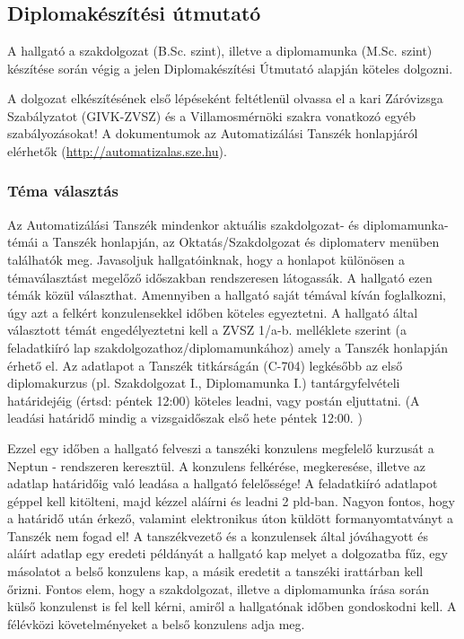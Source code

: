 \chapter{\bevezetes}

\section{Diplomakészítési útmutató}

A hallgató a szakdolgozat (B.Sc. szint), illetve a diplomamunka (M.Sc. szint) készítése során végig a jelen Diplomakészítési Útmutató alapján köteles dolgozni.

A dolgozat elkészítésének első lépéseként feltétlenül olvassa el a kari Záróvizsga Szabályzatot (GIVK-ZVSZ) és a Villamosmérnöki szakra vonatkozó egyéb szabályozásokat! A dokumentumok az Automatizálási Tanszék honlapjáról elérhetők (\url{http://automatizalas.sze.hu}).

\subsection{Téma választás}
Az Automatizálási Tanszék mindenkor aktuális szakdolgozat- és diplomamunka-témái a Tanszék honlapján, az Oktatás/Szakdolgozat és diplomaterv menüben találhatók meg. Javasoljuk hallgatóinknak, hogy a honlapot különösen a témaválasztást megelőző időszakban rendszeresen látogassák. A hallgató ezen  témák közül választhat. Amennyiben a hallgató saját témával kíván foglalkozni, úgy azt a felkért konzulensekkel időben köteles egyeztetni. A hallgató által választott témát engedélyeztetni kell a ZVSZ 1/a-b. melléklete szerint (a feladatkiíró lap szakdolgozathoz/diplomamunkához) amely a Tanszék honlapján érhető el.  Az adatlapot a Tanszék titkárságán (C-704) legkésőbb az első diplomakurzus (pl. Szakdolgozat I., Diplomamunka I.) tantárgyfelvételi határidejéig (értsd: péntek 12:00)  köteles leadni, vagy postán eljuttatni.  (A  leadási határidő mindig a vizsgaidőszak első hete péntek 12:00. ) 

Ezzel egy időben a hallgató felveszi a tanszéki konzulens megfelelő kurzusát a Neptun - rendszeren keresztül. A  konzulens felkérése, megkeresése, illetve az adatlap határidőig való leadása a hallgató felelőssége! A feladatkiíró  adatlapot géppel kell kitölteni, majd kézzel aláírni és leadni 2 pld-ban. Nagyon fontos, hogy a határidő után érkező, valamint elektronikus úton küldött formanyomtatványt a Tanszék nem fogad el! A  tanszékvezető és a konzulensek által jóváhagyott és aláírt adatlap egy eredeti példányát a hallgató kap melyet a dolgozatba fűz, egy másolatot a belső konzulens kap, a másik eredetit a tanszéki irattárban kell őrizni.  Fontos elem, hogy a szakdolgozat, illetve a diplomamunka írása során külső konzulenst is fel kell kérni, amiről a hallgatónak időben gondoskodni kell. A félévközi követelményeket a belső konzulens adja meg.

